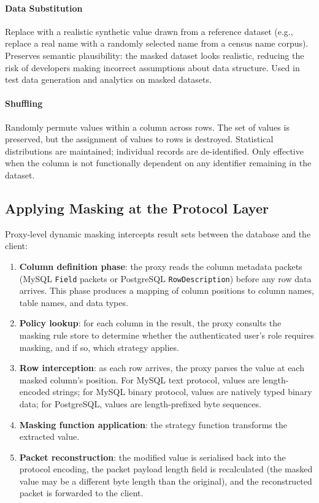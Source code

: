 \paragraph{Data Substitution}

Replace with a realistic synthetic value drawn from a reference dataset (e.g., replace a real name with a randomly selected name from a census name corpus). Preserves semantic plausibility: the masked dataset looks realistic, reducing the risk of developers making incorrect assumptions about data structure. Used in test data generation and analytics on masked datasets.

\paragraph{Shuffling}

Randomly permute values within a column across rows. The set of values is preserved, but the assignment of values to rows is destroyed. Statistical distributions are maintained; individual records are de-identified. Only effective when the column is not functionally dependent on any identifier remaining in the dataset.

\subsection{Applying Masking at the Protocol Layer}

Proxy-level dynamic masking intercepts result sets between the database and the client:

\begin{enumerate}
    \item \textbf{Column definition phase}: the proxy reads the column metadata packets (MySQL \texttt{Field} packets or PostgreSQL \texttt{RowDescription}) before any row data arrives. This phase produces a mapping of column positions to column names, table names, and data types.
    \item \textbf{Policy lookup}: for each column in the result, the proxy consults the masking rule store to determine whether the authenticated user's role requires masking, and if so, which strategy applies.
    \item \textbf{Row interception}: as each row arrives, the proxy parses the value at each masked column's position. For MySQL text protocol, values are length-encoded strings; for MySQL binary protocol, values are natively typed binary data; for PostgreSQL, values are length-prefixed byte sequences.
    \item \textbf{Masking function application}: the strategy function transforms the extracted value.
    \item \textbf{Packet reconstruction}: the modified value is serialised back into the protocol encoding, the packet payload length field is recalculated (the masked value may be a different byte length than the original), and the reconstructed packet is forwarded to the client.
\end{enumerate}

